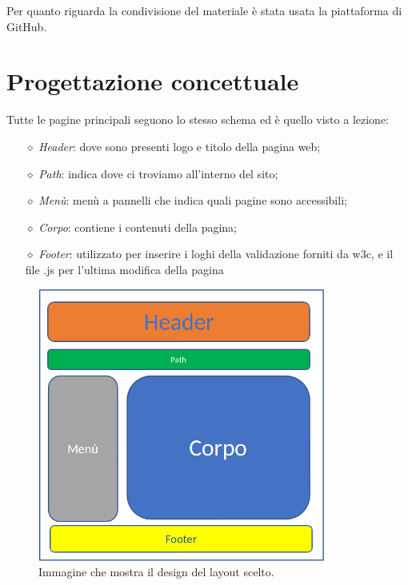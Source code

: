 \documentclass[12pt, a4paper]{article}
\renewcommand{\labelitemiii}{$\diamond$}
\begin{document}
Per quanto riguarda la condivisione del materiale è stata usata la piattaforma di GitHub.



 
\pagebreak %

\section{Progettazione concettuale}
Tutte le pagine principali seguono lo stesso schema ed è quello visto a lezione:
\begin{itemize}
	\item[\labelitemiii] \textit{Header}: dove sono presenti logo e titolo della pagina web;
	\item[\labelitemiii] \textit{Path}: indica dove ci troviamo all'interno del sito;
	\item[\labelitemiii] \textit{Menù}: menù a pannelli che indica quali pagine sono accessibili;
	\item[\labelitemiii] \textit{Corpo}: contiene i contenuti della pagina;
	\item[\labelitemiii] \textit{Footer}: utilizzato per inserire i loghi della validazione forniti da w3c, e il file .js per l’ultima modifica della pagina
\end{itemize}

\begin{figure}[htb]
	\centering
	\includegraphics[height=9cm]{img/prog.png}
	\caption{Immagine che mostra il design del layout scelto.}	
\end{figure}
\end{document}
